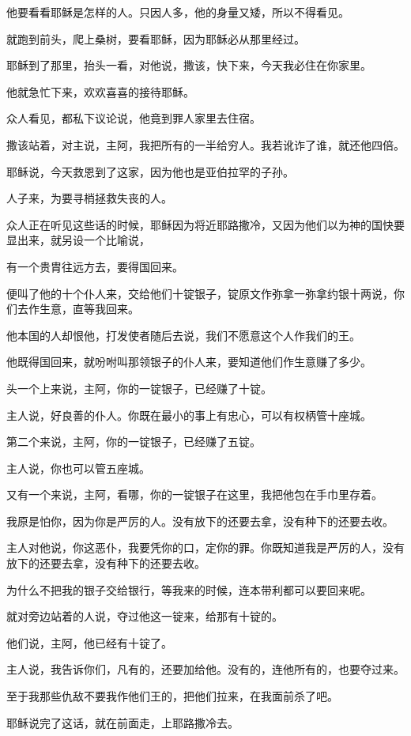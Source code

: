 \documentclass[12pt,oneside]{book}
\begin{document}
他要看看耶稣是怎样的人。只因人多，他的身量又矮，所以不得看见。

就跑到前头，爬上桑树，要看耶稣，因为耶稣必从那里经过。

耶稣到了那里，抬头一看，对他说，撒该，快下来，今天我必住在你家里。

他就急忙下来，欢欢喜喜的接待耶稣。

众人看见，都私下议论说，他竟到罪人家里去住宿。

撒该站着，对主说，主阿，我把所有的一半给穷人。我若讹诈了谁，就还他四倍。

耶稣说，今天救恩到了这家，因为他也是亚伯拉罕的子孙。

人子来，为要寻梢拯救失丧的人。

众人正在听见这些话的时候，耶稣因为将近耶路撒冷，又因为他们以为神的国快要显出来，就另设一个比喻说，

有一个贵胄往远方去，要得国回来。

便叫了他的十个仆人来，交给他们十锭银子，锭原文作弥拿一弥拿约银十两说，你们去作生意，直等我回来。

他本国的人却恨他，打发使者随后去说，我们不愿意这个人作我们的王。

他既得国回来，就吩咐叫那领银子的仆人来，要知道他们作生意赚了多少。

头一个上来说，主阿，你的一锭银子，已经赚了十锭。

主人说，好良善的仆人。你既在最小的事上有忠心，可以有权柄管十座城。

第二个来说，主阿，你的一锭银子，已经赚了五锭。

主人说，你也可以管五座城。

又有一个来说，主阿，看哪，你的一锭银子在这里，我把他包在手巾里存着。

我原是怕你，因为你是严厉的人。没有放下的还要去拿，没有种下的还要去收。

主人对他说，你这恶仆，我要凭你的口，定你的罪。你既知道我是严厉的人，没有放下的还要去拿，没有种下的还要去收。

为什么不把我的银子交给银行，等我来的时候，连本带利都可以要回来呢。

就对旁边站着的人说，夺过他这一锭来，给那有十锭的。

他们说，主阿，他已经有十锭了。

主人说，我告诉你们，凡有的，还要加给他。没有的，连他所有的，也要夺过来。

至于我那些仇敌不要我作他们王的，把他们拉来，在我面前杀了吧。

耶稣说完了这话，就在前面走，上耶路撒冷去。
\end{document}
